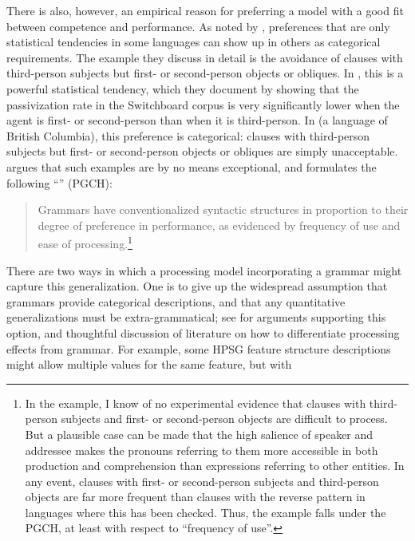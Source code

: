 \documentclass[output=paper,biblatex,babelshorthands,newtxmath,draftmode,colorlinks,citecolor=brown]{langscibook}
\begin{document}
\largerpage[-1] 
There is also, however, an empirical reason for preferring a model with a good fit
between competence and performance.  As noted by \citet{BresnanEtAl2001}, preferences that are only
statistical tendencies in some languages can show up in others as categorical requirements.  The
example they discuss in detail is the avoidance of clauses with third-person subjects but first- or
second-person objects or obliques. In , this is a powerful statistical tendency, which
they document by showing that the passivization rate in the Switchboard corpus is very significantly
lower when the agent is first- or second-person than when it is third-person.  In  (a
 language of British Columbia), this preference is categorical: clauses with
third-person subjects but first- or second-person objects or obliques are simply unacceptable.
\citet{Hawkins2004a-u,Hawkins2014} argues that such examples are by no means exceptional, and
formulates the following ``'' (PGCH):
\begin{quote}
Grammars  have  conventionalized  syntactic  structures  in  proportion   to their degree of
preference in performance, as evidenced by frequency of use and ease of processing.\footnote{In the
  \citeauthor{BresnanEtAl2001} example, I know of no experimental evidence that clauses with
  third-person subjects and first- or second-person objects are difficult to process.  But a
  plausible case can be made that the high salience of speaker and addressee makes the pronouns
  referring to them more accessible in both production and comprehension than expressions referring
  to other entities.  In any event, clauses with first- or second-person subjects and third-person
  objects are far more frequent than clauses with the reverse pattern in languages where this has
  been checked.  Thus, the \citeauthor{BresnanEtAl2001} example falls under the PGCH, at least with
  respect to ``frequency of use''.}
\end{quote}
\largerpage[-1]
There are two ways in which a processing model incorporating a grammar might capture this
generalization.  One is to give up the widespread assumption that grammars provide categorical
descriptions, and that any quantitative generalizations must be extra-grammatical; see
\citet{Francis2021} for arguments supporting this option, and thoughtful discussion of literature
on how to differentiate processing effects from grammar.  For example, some HPSG feature
structure descriptions might allow multiple values for the same feature, but with
\end{document}

